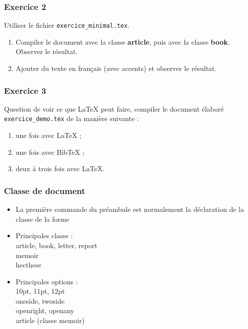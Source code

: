 
\begin{frame}[c]

	\frametitle{Exercice 2}
	
	Utiliser le fichier \texttt{exercice\_minimal.tex}.
	
	\begin{enumerate}
		\item Compiler le document avec la classe \textbf{article}, puis avec la classe
		\textbf{book}. Observer le résultat.
		
		\item Ajouter du texte en français (avec accents) et observer le résultat.
	\end{enumerate}
\end{frame}


\begin{frame}[c]

	\frametitle{Exercice 3}
	
	Question de voir ce que {\LaTeX} peut faire, compiler le document élaboré
	\texttt{exercice\_demo.tex} de la manière suivante :
	
	\begin{enumerate}
		\item une fois avec LaTeX ;
		\item une fois avec BibTeX ;
		\item deux à trois fois avec LaTeX.
	\end{enumerate}

\end{frame}


\begin{frame}[fragile]

	\frametitle{Classe de document}
	
	\begin{itemize}
		\item La première commande du préambule est normalement la déclaration de la classe de la forme
	\begin{codesource}
	\documentclass[options]{classe}
	\end{codesource}
				
		\pause
		
		\item Principales classe : \\
			article, book, letter, report \\
			memoir \\
			hecthese
		
		\pause
		
		\item Principales options : \\
			10pt, 11pt, 12pt \\
			oneside, twoside \\
			openright, openany \\
			article (classe memoir)
	\end{itemize}
\end{frame}

